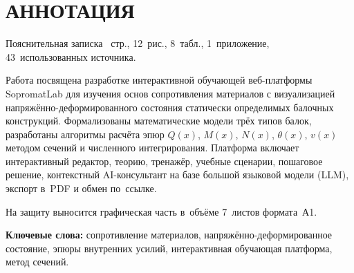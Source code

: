 \thispagestyle{gostfirst}
\enlargethispage{-25mm}

\section*{АННОТАЦИЯ}

Пояснительная записка \pageref{LastPage}~стр., 12~рис., 8~табл., 1~приложение, 43~использованных источника.

Работа посвящена разработке интерактивной обучающей веб-платформы SopromatLab для изучения основ сопротивления материалов с визуализацией напряжённо-деформированного состояния статически определимых балочных конструкций. Формализованы математические модели трёх типов балок, разработаны алгоритмы расчёта эпюр $Q(x)$, $M(x)$, $N(x)$, $\theta(x)$, $v(x)$ методом сечений и численного интегрирования. Платформа включает интерактивный редактор, теорию, тренажёр, учебные сценарии, пошаговое решение, контекстный AI-консультант на базе большой языковой модели (LLM), экспорт в~PDF и обмен по~ссылке.

На защиту выносится графическая часть в~объёме 7~листов формата~А1.

\textbf{Ключевые слова:} сопротивление материалов, напряжённо-деформированное состояние, эпюры внутренних усилий, интерактивная обучающая платформа, метод сечений.

\newpage
